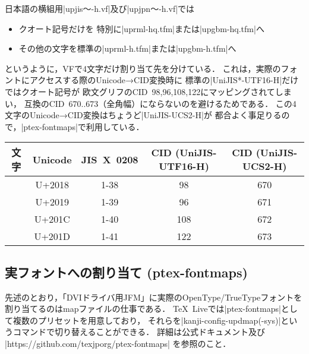 \documentclass[a4paper,11pt,nomag]{jsarticle}
\begin{document}
\begin{dangerous}
日本語の横組用|upjis〜-h.vf|及び|upjpn〜-h.vf|では
\begin{itemize}
 \item クオート記号だけを
  特別に|uprml-hq.tfm|または|upgbm-hq.tfm|へ
 \item その他の文字を標準の|uprml-h.tfm|または|upgbm-h.tfm|へ
\end{itemize}
というように，VFで4文字だけ割り当て先を分けている．
これは，実際のフォントにアクセスする際のUnicode→CID変換時に
標準の|UniJIS*-UTF16-H|だけではクオート記号が
欧文グリフのCID~98,96,108,122にマッピングされてしまい，
\pTeX 互換のCID~670..673（全角幅）にならないのを避けるためである．
この4文字のUnicode→CID変換はちょうど|UniJIS-UCS2-H|が
都合よく事足りるので，|ptex-fontmaps|で利用している．
\end{dangerous}
\begin{table}[b]
\centering
\begin{tabular}{ccccc}\hline
文字 & Unicode & JIS~X~0208
 & CID (UniJIS-UTF16-H) & CID (UniJIS-UCS2-H) \\ \hline
\codechar{‘} & U+2018 & 1-38 & 98 & 670 \\
\codechar{’} & U+2019 & 1-39 & 96 & 671 \\
\codechar{“} & U+201C & 1-40 & 108 & 672 \\
\codechar{”} & U+201D & 1-41 & 122 & 673 \\ \hline
\end{tabular}
\end{table}

\subsection{実フォントへの割り当て (ptex-fontmaps)}

先述のとおり，「DVIドライバ用JFM」に実際のOpenType/TrueTypeフォントを
割り当てるのはmapファイルの仕事である．
\TeX~Liveでは|ptex-fontmaps|として複数のプリセットを用意しており，
それらを|kanji-config-updmap(-sys)|というコマンドで切り替えることができる．
詳細は公式ドキュメント及び |https://github.com/texjporg/ptex-fontmaps| を参照のこと．
\end{document}
